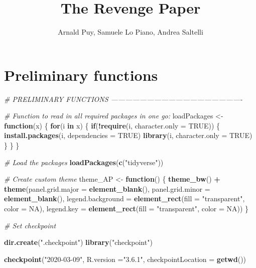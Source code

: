 \documentclass[11pt,]{article}
\title{The Revenge Paper}
\author{Arnald Puy, Samuele Lo Piano, Andrea Saltelli}
\date{}
\newenvironment{Shaded}{\begin{snugshade}}{\end{snugshade}}
\newcommand{\CommentTok}[1]{\textcolor[rgb]{0.56,0.35,0.01}{\textit{#1}}}
\newcommand{\ControlFlowTok}[1]{\textcolor[rgb]{0.13,0.29,0.53}{\textbf{#1}}}
\newcommand{\DataTypeTok}[1]{\textcolor[rgb]{0.13,0.29,0.53}{#1}}
\newcommand{\KeywordTok}[1]{\textcolor[rgb]{0.13,0.29,0.53}{\textbf{#1}}}
\newcommand{\NormalTok}[1]{#1}
\newcommand{\OperatorTok}[1]{\textcolor[rgb]{0.81,0.36,0.00}{\textbf{#1}}}
\newcommand{\OtherTok}[1]{\textcolor[rgb]{0.56,0.35,0.01}{#1}}
\newcommand{\StringTok}[1]{\textcolor[rgb]{0.31,0.60,0.02}{#1}}
\begin{document}
\maketitle

{
\setcounter{tocdepth}{2}
\tableofcontents
}
\newpage

\hypertarget{preliminary-functions}{%
\section{Preliminary functions}\label{preliminary-functions}}

\begin{Shaded}
\begin{Highlighting}[]
\CommentTok{# PRELIMINARY FUNCTIONS -------------------------------------------------------}

\CommentTok{# Function to read in all required packages in one go:}
\NormalTok{loadPackages <-}\StringTok{ }\ControlFlowTok{function}\NormalTok{(x) \{}
  \ControlFlowTok{for}\NormalTok{(i }\ControlFlowTok{in}\NormalTok{ x) \{}
    \ControlFlowTok{if}\NormalTok{(}\OperatorTok{!}\KeywordTok{require}\NormalTok{(i, }\DataTypeTok{character.only =} \OtherTok{TRUE}\NormalTok{)) \{}
      \KeywordTok{install.packages}\NormalTok{(i, }\DataTypeTok{dependencies =} \OtherTok{TRUE}\NormalTok{)}
      \KeywordTok{library}\NormalTok{(i, }\DataTypeTok{character.only =} \OtherTok{TRUE}\NormalTok{)}
\NormalTok{    \}}
\NormalTok{  \}}
\NormalTok{\}}

\CommentTok{# Load the packages}
\KeywordTok{loadPackages}\NormalTok{(}\KeywordTok{c}\NormalTok{(}\StringTok{"tidyverse"}\NormalTok{))}

\CommentTok{# Create custom theme}
\NormalTok{theme_AP <-}\StringTok{ }\ControlFlowTok{function}\NormalTok{() \{}
  \KeywordTok{theme_bw}\NormalTok{() }\OperatorTok{+}
\StringTok{    }\KeywordTok{theme}\NormalTok{(}\DataTypeTok{panel.grid.major =} \KeywordTok{element_blank}\NormalTok{(),}
          \DataTypeTok{panel.grid.minor =} \KeywordTok{element_blank}\NormalTok{(),}
          \DataTypeTok{legend.background =} \KeywordTok{element_rect}\NormalTok{(}\DataTypeTok{fill =} \StringTok{"transparent"}\NormalTok{,}
                                           \DataTypeTok{color =} \OtherTok{NA}\NormalTok{),}
          \DataTypeTok{legend.key =} \KeywordTok{element_rect}\NormalTok{(}\DataTypeTok{fill =} \StringTok{"transparent"}\NormalTok{,}
                                    \DataTypeTok{color =} \OtherTok{NA}\NormalTok{))}
\NormalTok{\}}

\CommentTok{# Set checkpoint}

\KeywordTok{dir.create}\NormalTok{(}\StringTok{".checkpoint"}\NormalTok{)}
\KeywordTok{library}\NormalTok{(}\StringTok{"checkpoint"}\NormalTok{)}

\KeywordTok{checkpoint}\NormalTok{(}\StringTok{"2020-03-09"}\NormalTok{, }
           \DataTypeTok{R.version =}\StringTok{"3.6.1"}\NormalTok{, }
           \DataTypeTok{checkpointLocation =} \KeywordTok{getwd}\NormalTok{())}
\end{Highlighting}
\end{Shaded}
\end{document}
